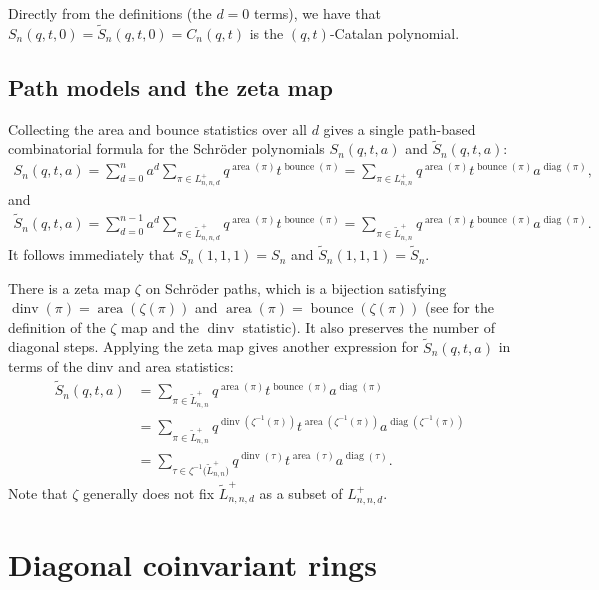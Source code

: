 \documentclass[11pt, noadjust, reqno]{amsart}
\theoremstyle{definition}
\theoremstyle{remark}
\numberwithin{equation}{section}
\newcommand{\0}{\emptyset}
\DeclareMathOperator{\area}{area}
\DeclareMathOperator{\bounce}{bounce}
\DeclareMathOperator{\dinv}{dinv}
\DeclareMathOperator{\diag}{diag}
\begin{document}
Directly from the definitions (the $d=0$ terms), we have that $S_n(q,t,0)=\widetilde{S}_n(q,t,0)=C_n(q,t)$ is the $(q,t)$-Catalan polynomial. 

\subsection{Path models and the zeta map}
Collecting the area and bounce statistics over all $d$ gives a single path-based combinatorial formula for the Schr\"oder polynomials $S_n(q,t,a)$ and $\widetilde{S}_n(q,t,a)$:
\begin{align*}
    S_n(q,t,a)
    = \sum_{d=0}^{n}a^d \sum_{\pi \in L_{n,n,d}^+} q^{\area(\pi)} t^{\bounce(\pi)} = \sum_{\pi \in L_{n,n}^+}q^{\area(\pi)} t^{\bounce(\pi)}a^{\diag(\pi)},
\end{align*}
and
\begin{align*}
    \widetilde{S}_n(q,t,a)
    = \sum_{d=0}^{n-1}a^d \sum_{\pi \in \tilde{L}_{n,n,d}^+} q^{\area(\pi)} t^{\bounce(\pi)} = \sum_{\pi \in \tilde{L}_{n,n}^+}q^{\area(\pi)} t^{\bounce(\pi)}a^{\diag(\pi)}.
\end{align*}
It follows immediately that $S_n(1,1,1)= S_n$ and $\widetilde{S}_n(1,1,1)= \widetilde{S}_n$.


There is a zeta map $\zeta$ on Schr\"oder paths, which is a bijection satisfying $\dinv(\pi) = \area(\zeta(\pi))$ and $\area(\pi) = \bounce(\zeta(\pi))$ (see \cite[Chapter 4]{Haglund2008} for the definition of the $\zeta$ map and the $\dinv$ statistic). 
It also preserves the number of diagonal steps.
Applying the zeta map gives another expression for $\widetilde{S}_n(q,t,a)$ in terms of the dinv and area statistics:
\begin{align*}
    \widetilde{S}_n(q,t,a)
        &= \sum_{\pi \in \tilde{L}_{n,n}^+}q^{\area(\pi)} t^{\bounce(\pi)}a^{\diag(\pi)}\\
            &= \sum_{\pi \in {\tilde{L}_{n,n}^+} }q^{\dinv(\zeta^{-1}(\pi))} t^{\area(\zeta^{-1}(\pi))}a^{\diag(\zeta^{-1}(\pi))}\\
    &= \sum_{\tau \in {\zeta^{-1}(\tilde{L}_{n,n}^+} )}q^{\dinv(\tau)} t^{\area(\tau)}a^{\diag(\tau)}.
\end{align*}
Note that $\zeta$ generally does not fix $\tilde{L}_{n,n,d}^+$ as a subset of ${L}_{n,n,d}^+$.









\section{Diagonal coinvariant rings}\label{sec:background}
\end{document}
